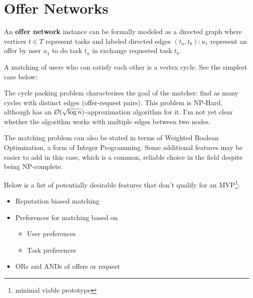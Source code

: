 \documentclass[main.tex]{subfiles}
\begin{document}
\section{Offer Networks}
An \textbf{offer network} instance can be formally modeled as a directed graph where vertices $t \in T$ represent tasks and labeled directed edges $(t_a,t_b) : u_1$ represent an offer by user $u_1$ to do task $t_a$ in exchange requested task $t_b$.
\begin{center}
\end{center}

A matching of users who can satisfy each other is a vertex cycle. See the simplest case below:

\begin{center}
\end{center}

The cycle packing problem \cite{Kri} characterises the goal of the matcher: find as many cycles with distinct edges (offer-request pairs). This problem is NP-Hard, although \cite{Kri} has an $\mathcal{O}(\sqrt{\log n})$-approximation algorithm for it. I'm not yet clear whether the algorithm works with multiple edges between two nodes.

The matching problem can also be stated in terms of Weighted Boolean Optimization, a form of Integer Programming. Some additional features may be easier to add in this case, which is a common, reliable choice in the field despite being NP-complete.

Below is a list of potentially desirable features that don't qualify for an MVP\footnote{minimal viable prototype}:
\begin{itemize}
  \item Reputation biased matching
  \item Preferences for matching based on
    \begin{itemize}
      \item User preferences
      \item Task prefreences
    \end{itemize}
  \item ORs and ANDs of offers or request
\end{itemize}
\end{document}
